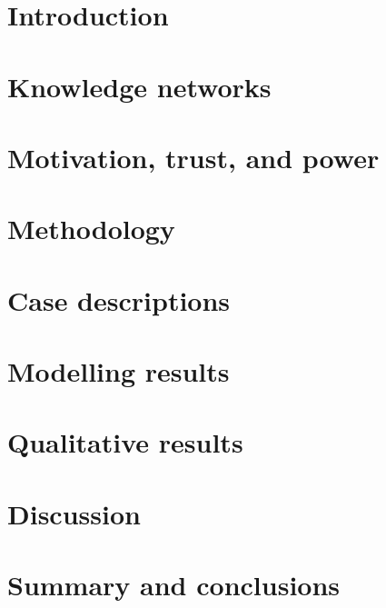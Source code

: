 \documentclass[12pt,table]{book}
\begin{document}
\newpage
\setcounter{tocdepth}{3}
\tableofcontents

\newpage

\listoffigures

\newpage

\listoftables

\mainmatter

\chapter{Introduction}


\chapter{Knowledge networks}


\chapter{Motivation, trust, and power}


\chapter{Methodology}


\chapter{Case descriptions}


\chapter{Modelling results}

%
\chapter{Qualitative results}

%
\chapter{Discussion}

%
\chapter{Summary and conclusions}


\backmatter
\pagebreak
\end{document}
